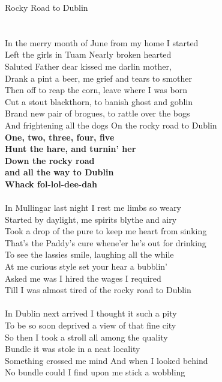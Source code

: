 \documentclass[letterpaper,9pt]{article}
\begin{document}
\newpage
{}
\huge
Rocky Road to Dublin\\
\\
\LARGE
\\In the merry month of June from my home I started
\\Left the girls in Tuam Nearly broken hearted
\\Saluted Father dear kissed me darlin mother,
\\Drank a pint a beer, me grief and tears to smother
\\Then off to reap the corn, leave where I was born
\\Cut a stout blackthorn, to banish ghost and goblin
\\Brand new pair of brogues, to rattle over the bogs
\\And frightening all the dogs On the rocky road to Dublin
\\\textbf{One, two, three, four, five
\\Hunt the hare, and turnin' her
\\Down the rocky road
\\and all the way to Dublin
\\Whack fol-lol-dee-dah}
\\
\\In Mullingar last night I rest me limbs so weary
\\Started by daylight, me spirits blythe and airy
\\Took a drop of the pure to keep me heart from sinking
\\That's the Paddy's cure whene'er he's out for drinking
\\To see the lassies smile, laughing all the while
\\At me curious style set your hear a bubblin'
\\Asked me was I hired the wages I required
\\Till I was almost tired of the rocky road to Dublin
\\
\newpage
\\In Dublin next arrived I thought it such a pity
\\To be so soon deprived a view of that fine city
\\So then I took a stroll all among the quality
\\Bundle it was stole in a neat locality
\\Something crossed me mind And when I looked behind
\\No bundle could I find upon me stick a wobbling
\end{document}
